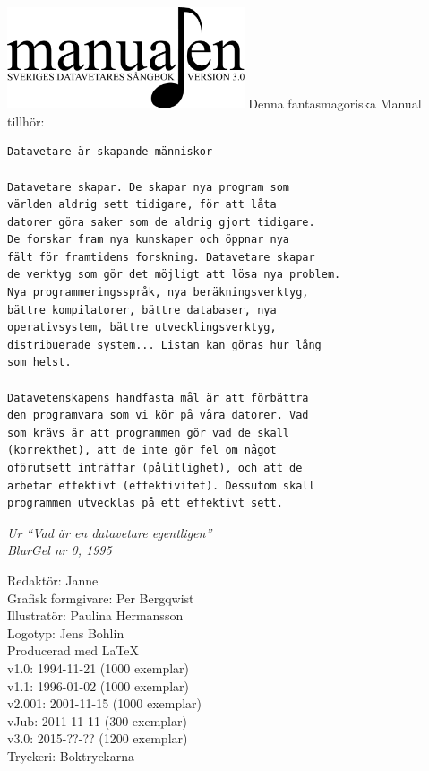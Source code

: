 \documentclass[a6paper,fontsize=10pt,twoside,open=right]{scrbook}
\begin{document}
\vspace*{6.5cm}
\hspace*{0.9cm}
\includegraphics[keepaspectratio,width=7cm]{elements/logo.pdf}
\clearpage
\noindent Denna fantasmagoriska Manual tillhör:
\ohead{\textnormal{\textsc{\scriptsize\leftmark}}}
\ofoot[\pagemark]{\textsc{\scriptsize\pagemark}}
\clearpage
{}
{\small\begin{verbatim}
Datavetare är skapande människor

Datavetare skapar. De skapar nya program som
världen aldrig sett tidigare, för att låta
datorer göra saker som de aldrig gjort tidigare.
De forskar fram nya kunskaper och öppnar nya
fält för framtidens forskning. Datavetare skapar
de verktyg som gör det möjligt att lösa nya problem.
Nya programmeringsspråk, nya beräkningsverktyg,
bättre kompilatorer, bättre databaser, nya
operativsystem, bättre utvecklingsverktyg,
distribuerade system... Listan kan göras hur lång
som helst.
  
Datavetenskapens handfasta mål är att förbättra
den programvara som vi kör på våra datorer. Vad
som krävs är att programmen gör vad de skall
(korrekthet), att de inte gör fel om något
oförutsett inträffar (pålitlighet), och att de
arbetar effektivt (effektivitet). Dessutom skall
programmen utvecklas på ett effektivt sett.
\end{verbatim}}
\vspace{10pt}
{\footnotesize\textit{Ur ``Vad är en datavetare
egentligen''\\ BlurGel nr 0, 1995}}
\clearpage
\setlength{\parindent}{15pt}
\null
\vfill
    {\noindent\small\centering
      Redaktör: Janne\\
      Grafisk formgivare: Per Bergqwist\\
      Illustratör: Paulina Hermansson\\
      Logotyp: Jens Bohlin\\
      Producerad med \LaTeX\\
      v1.0: 1994-11-21 (1000 exemplar)\\
      v1.1: 1996-01-02 (1000 exemplar)\\
      v2.001: 2001-11-15 (1000 exemplar)\\
      vJub: 2011-11-11 (300 exemplar)\\
      v3.0: 2015-??-?? (1200 exemplar)\\
      Tryckeri: Boktryckarna\par
    }
\cleardoublepage
\end{document}
